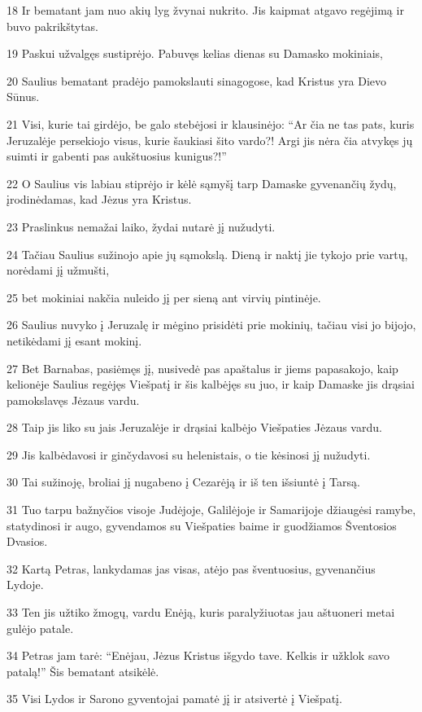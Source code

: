 \par 18 Ir bematant jam nuo akių lyg žvynai nukrito. Jis kaipmat atgavo regėjimą ir buvo pakrikštytas. 
\par 19 Paskui užvalgęs sustiprėjo. Pabuvęs kelias dienas su Damasko mokiniais, 
\par 20 Saulius bematant pradėjo pamokslauti sinagogose, kad Kristus yra Dievo Sūnus. 
\par 21 Visi, kurie tai girdėjo, be galo stebėjosi ir klausinėjo: “Ar čia ne tas pats, kuris Jeruzalėje persekiojo visus, kurie šaukiasi šito vardo?! Argi jis nėra čia atvykęs jų suimti ir gabenti pas aukštuosius kunigus?!” 
\par 22 O Saulius vis labiau stiprėjo ir kėlė sąmyšį tarp Damaske gyvenančių žydų, įrodinėdamas, kad Jėzus yra Kristus. 
\par 23 Praslinkus nemažai laiko, žydai nutarė jį nužudyti. 
\par 24 Tačiau Saulius sužinojo apie jų sąmokslą. Dieną ir naktį jie tykojo prie vartų, norėdami jį užmušti, 
\par 25 bet mokiniai nakčia nuleido jį per sieną ant virvių pintinėje. 
\par 26 Saulius nuvyko į Jeruzalę ir mėgino prisidėti prie mokinių, tačiau visi jo bijojo, netikėdami jį esant mokinį. 
\par 27 Bet Barnabas, pasiėmęs jį, nusivedė pas apaštalus ir jiems papasakojo, kaip kelionėje Saulius regėjęs Viešpatį ir šis kalbėjęs su juo, ir kaip Damaske jis drąsiai pamokslavęs Jėzaus vardu. 
\par 28 Taip jis liko su jais Jeruzalėje ir drąsiai kalbėjo Viešpaties Jėzaus vardu. 
\par 29 Jis kalbėdavosi ir ginčydavosi su helenistais, o tie kėsinosi jį nužudyti. 
\par 30 Tai sužinoję, broliai jį nugabeno į Cezarėją ir iš ten išsiuntė į Tarsą. 
\par 31 Tuo tarpu bažnyčios visoje Judėjoje, Galilėjoje ir Samarijoje džiaugėsi ramybe, statydinosi ir augo, gyvendamos su Viešpaties baime ir guodžiamos Šventosios Dvasios. 
\par 32 Kartą Petras, lankydamas jas visas, atėjo pas šventuosius, gyvenančius Lydoje. 
\par 33 Ten jis užtiko žmogų, vardu Enėją, kuris paralyžiuotas jau aštuoneri metai gulėjo patale. 
\par 34 Petras jam tarė: “Enėjau, Jėzus Kristus išgydo tave. Kelkis ir užklok savo patalą!” Šis bematant atsikėlė. 
\par 35 Visi Lydos ir Sarono gyventojai pamatė jį ir atsivertė į Viešpatį. 
